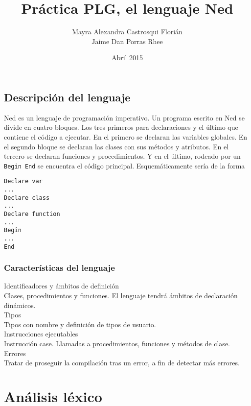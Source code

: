 \documentclass[10pt,a4paper]{article}
\title{\huge Práctica PLG, el lenguaje Ned}
\author{Mayra Alexandra Castrosqui Florián\\
	Jaime Dan Porras Rhee
\date{Abril 2015}
}
\newcommand{\cc}[1]{\texttt{#1}}
\begin{document}
\maketitle
{}



\subsection*{Descripción del lenguaje}
Ned es un lenguaje de programación imperativo. Un programa escrito en Ned se divide en cuatro bloques. Los tres primeros para declaraciones y el último que contiene el código a ejecutar. 
En el primero se declaran las variables globales. En el segundo bloque se declaran las clases con sus métodos y atributos. En el tercero se declaran funciones y procedimientos. Y en el último, rodeado por un \cc{Begin End} se encuentra el código principal.
Esquemáticamente sería de la forma 

\begin{verbatim}
Declare var
...
Declare class
...
Declare function
...
Begin
...
End
\end{verbatim}

\subsubsection*{Características del lenguaje}

Identificadores y ámbitos de definición \\
Clases, procedimientos y funciones. El lenguaje tendrá ámbitos de declaración dinámicos.\\

Tipos\\
Tipos con nombre y definición de tipos de usuario.\\

Instrucciones ejecutables\\
Instrucción case. Llamadas a procedimientos, funciones y métodos de clase.\\

Errores\\
Tratar de proseguir la compilación tras un error, a fin de detectar más errores.\\


\section{Análisis léxico}
\end{document}
